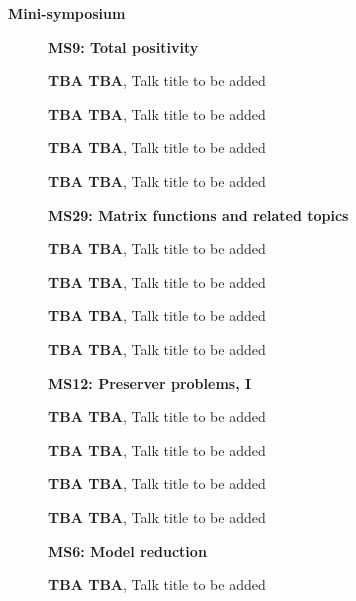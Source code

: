 \documentclass[ILAS2025-program.tex]{subfiles}
\begin{document}
\begin{description}
    \item[] \textbf{Mini-symposium} 
    \begin{description}
    \item[] \textbf{MS9: Total positivity} 
    \item[] \textbf{TBA TBA}, Talk title to be added
        \item[] \textbf{TBA TBA}, Talk title to be added
        \item[] \textbf{TBA TBA}, Talk title to be added
        \item[] \textbf{TBA TBA}, Talk title to be added
        \end{description}
    \begin{description}
    \item[] \textbf{MS29: Matrix functions and related topics} 
    \item[] \textbf{TBA TBA}, Talk title to be added
        \item[] \textbf{TBA TBA}, Talk title to be added
        \item[] \textbf{TBA TBA}, Talk title to be added
        \item[] \textbf{TBA TBA}, Talk title to be added
        \end{description}
    \begin{description}
    \item[] \textbf{MS12: Preserver problems, I} 
    \item[] \textbf{TBA TBA}, Talk title to be added
        \item[] \textbf{TBA TBA}, Talk title to be added
        \item[] \textbf{TBA TBA}, Talk title to be added
        \item[] \textbf{TBA TBA}, Talk title to be added
        \end{description}
    \begin{description}
    \item[] \textbf{MS6: Model reduction} 
    \item[] \textbf{TBA TBA}, Talk title to be added

\end{description}
\end{description}
\end{document}
